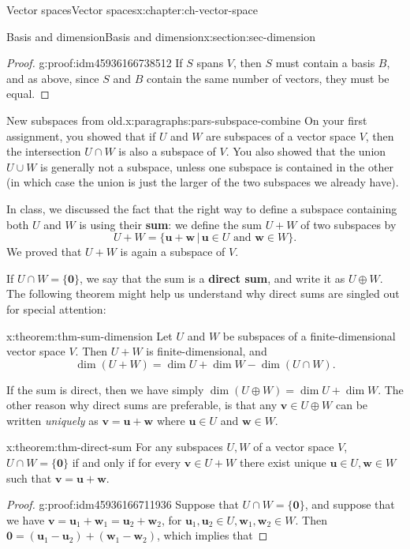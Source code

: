 \documentclass[oneside,10pt,]{book}
\newcommand{\terminology}[1]{\textbf{#1}}
\numberwithin{equation}{section}
\newcommand{\uu}{\mathbf{u}}
\newcommand{\vv}{\mathbf{v}}
\newcommand{\ww}{\mathbf{w}}
\begin{document}
\begin{chapterptx}{Vector spaces}{}{Vector spaces}{}{}{x:chapter:ch-vector-space}
\begin{sectionptx}{Basis and dimension}{}{Basis and dimension}{}{}{x:section:sec-dimension}
\begin{proof}{}{g:proof:idm45936166738512}
If \(S\) spans \(V\), then \(S\) must contain a basis \(B\), and as above, since \(S\) and \(B\) contain the same number of vectors, they must be equal.%
\end{proof}
\begin{paragraphs}{New subspaces from old.}{x:paragraphs:pars-subspace-combine}%
On your first assignment, you showed that if \(U\) and \(W\) are subspaces of a vector space \(V\), then the intersection \(U\cap W\) is also a subspace of \(V\). You also showed that the union \(U\cup W\) is generally not a subspace, unless one subspace is contained in the other (in which case the union is just the larger of the two subspaces we already have).%
\par
In class, we discussed the fact that the right way to define a subspace containing both \(U\) and \(W\) is using their \terminology{sum}: we define the sum \(U+W\) of two subspaces by%
\begin{equation*}
U+W = \{\uu+\ww \,|\, \uu\in U \text{ and } \ww\in W\}\text{.}
\end{equation*}
We proved that \(U+W\) is again a subspace of \(V\).%
\par
If \(U\cap W = \{\mathbf{0}\}\), we say that the sum is a \terminology{direct sum}, and write it as \(U\oplus W\). The following theorem might help us understand why direct sums are singled out for special attention:%
\begin{theorem}{}{}{x:theorem:thm-sum-dimension}%
Let \(U\) and \(W\) be subspaces of a finite-dimensional vector space \(V\). Then \(U+W\) is finite-dimensional, and%
\begin{equation*}
\dim(U+W)=\dim U + \dim W - \dim(U\cap W)\text{.}
\end{equation*}
%
\end{theorem}
If the sum is direct, then we have simply \(\dim(U\oplus W) = \dim U + \dim W\). The other reason why direct sums are preferable, is that any \(\vv\in U\oplus W\) can be written \emph{uniquely} as \(\vv=\uu+\ww\) where \(\uu\in U\) and \(\ww\in W\).%
\begin{theorem}{}{}{x:theorem:thm-direct-sum}%
For any subspaces \(U,W\) of a vector space \(V\), \(U\cap W = \{\mathbf{0}\}\) if and only if for every \(\vv\in U+W\) there exist unique \(\uu\in U, \ww\in W\) such that \(\vv=\uu+\ww\).%
\end{theorem}
\begin{proof}{}{g:proof:idm45936166711936}
Suppose that \(U\cap W = \{\mathbf{0}\}\), and suppose that we have \(\vv = \uu_1+\ww_1 = \uu_2+\ww_2\), for \(\uu_1,\uu_2\in U,\ww_1,\ww_2\in W\). Then \(\mathbf{0}=(\uu_1-\uu_2)+(\ww_1-\ww_2)\), which implies that%

\end{proof}
\end{paragraphs}
\end{sectionptx}
\end{chapterptx}
\end{document}
